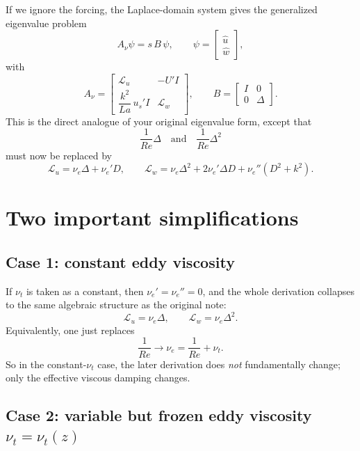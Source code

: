 \documentclass[11pt]{article}
\begin{document}
If we ignore the forcing, the Laplace-domain system gives the generalized eigenvalue problem
\begin{equation}
A_\nu \psi = s\,B\,\psi,
\qquad
\psi=
\begin{bmatrix}
\hat u\\[3pt]
\hat w
\end{bmatrix},
\label{eq:eig-problem}
\end{equation}
with
\begin{equation}
A_\nu
=
\begin{bmatrix}
\mathcal L_u & -U' I\\[3pt]
\dfrac{k^2}{La}\,u_s' I & \mathcal L_w
\end{bmatrix},
\qquad
B=
\begin{bmatrix}
I & 0\\
0 & \Delta
\end{bmatrix}.
\label{eq:eig-matrices}
\end{equation}
This is the direct analogue of your original eigenvalue form, except that
\[
\frac{1}{Re}\Delta
\quad\text{and}\quad
\frac{1}{Re}\Delta^2
\]
must now be replaced by
\[
\mathcal L_u = \nu_e \Delta + \nu_e' D,
\qquad
\mathcal L_w = \nu_e \Delta^2 + 2\nu_e' \Delta D + \nu_e''(D^2+k^2).
\]

\section{Two important simplifications}

\subsection{Case 1: constant eddy viscosity}

If \(\nu_t\) is taken as a constant, then \(\nu_e'=\nu_e''=0\), and the whole derivation collapses to the same algebraic structure as the original note:
\[
\mathcal L_u = \nu_e \Delta,
\qquad
\mathcal L_w = \nu_e \Delta^2.
\]
Equivalently, one just replaces
\[
\frac{1}{Re}
\longrightarrow
\nu_e = \frac{1}{Re}+\nu_t.
\]
So in the constant-\(\nu_t\) case, the later derivation does \emph{not} fundamentally change; only the effective viscous damping changes.

\subsection{Case 2: variable but frozen eddy viscosity \(\nu_t=\nu_t(z)\)}
\end{document}
